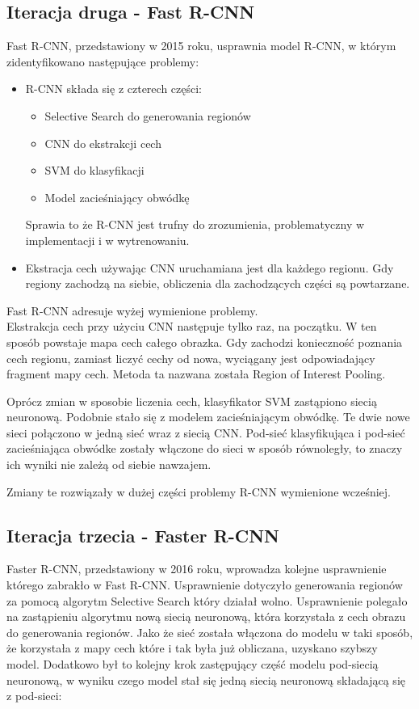\subsection{Iteracja druga - Fast R-CNN}

Fast R-CNN, przedstawiony w 2015 roku, usprawnia model R-CNN, w którym zidentyfikowano następujące problemy:

\begin{itemize}
	\item R-CNN składa się z czterech części:
		\begin{itemize}
			\item Selective Search do generowania regionów
			\item CNN do ekstrakcji cech
			\item SVM do klasyfikacji
			\item Model zacieśniający obwódkę
		\end{itemize}
		Sprawia to że R-CNN jest trufny do zrozumienia, problematyczny w implementacji i w wytrenowaniu.
	\item Ekstracja cech używając CNN uruchamiana jest dla każdego regionu. Gdy regiony zachodzą na siebie, obliczenia dla zachodzących części są powtarzane.
\end{itemize}

Fast R-CNN adresuje wyżej wymienione problemy. \\

Ekstrakcja cech przy użyciu CNN następuje tylko raz, na początku. W ten sposób powstaje mapa cech całego obrazka. Gdy zachodzi konieczność poznania cech regionu, zamiast liczyć cechy od nowa, wyciągany jest odpowiadający fragment mapy cech. Metoda ta nazwana została Region of Interest Pooling.

Oprócz zmian w sposobie liczenia cech, klasyfikator SVM zastąpiono siecią neuronową. Podobnie stało się z modelem zacieśniającym obwódkę. Te dwie nowe sieci połączono w jedną sieć wraz z siecią CNN. Pod-sieć klasyfikująca i pod-sieć zacieśniająca obwódke zostały włączone do sieci w sposób równoległy, to znaczy ich wyniki nie zależą od siebie nawzajem.

Zmiany te rozwiązały w dużej części problemy R-CNN wymienione wcześniej.

\subsection{Iteracja trzecia - Faster R-CNN}

Faster R-CNN, przedstawiony w 2016 roku, wprowadza kolejne usprawnienie którego zabrakło w Fast R-CNN. Usprawnienie dotyczyło generowania regionów za pomocą algorytm Selective Search który działał wolno. Usprawnienie polegało na zastąpieniu algorytmu nową siecią neuronową, która korzystała z cech obrazu do generowania regionów. Jako że sieć została włączona do modelu w taki sposób, że korzystała z mapy cech które i tak była już obliczana, uzyskano szybszy model. Dodatkowo był to kolejny krok zastępujący część modelu pod-siecią neuronową, w wyniku czego model stał się jedną siecią neuronową składającą się z pod-sieci:

